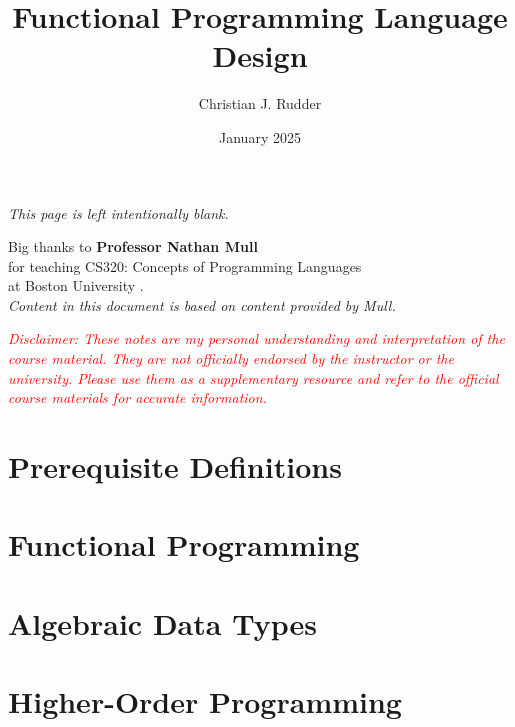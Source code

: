 \documentclass{memoir}
\title{Functional Programming Language Design}
\author{Christian J. Rudder}
\date{January 2025}
\begin{document}
\maketitle
\setcounter{secnumdepth}{2} %
\setcounter{tocdepth}{2}

\tableofcontents

\newpage
\thispagestyle{empty}
\mbox{}
\vfill
\begin{center}
    \textit{This page is left intentionally blank.}
\end{center}
\vfill
\newpage
\thispagestyle{empty}
\mbox{}
\vfill
\begin{center}
    \Large{Big thanks to \textbf{Professor Nathan Mull}}\\
    \normalsize 
    for teaching CS320: Concepts of Programming Languages\\
    at Boston University \cite{mull_cs320}.\\
    \textit{Content in this document is based on content provided by Mull.}\\
    \vfill
    \begin{center}
        \textcolor{red}{\textit{Disclaimer: These notes are my personal understanding and interpretation of the course material. 
        They are not officially endorsed by the instructor or the university. Please use them as a supplementary resource and refer 
        to the official course materials for accurate information.}}
    \end{center}
\end{center}

\vfill

\chapter*{Prerequisite Definitions}


\chapter{Functional Programming}





\chapter {Algebraic Data Types}


\chapter{Higher-Order Programming}



\end{document}

